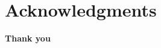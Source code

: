 \section*{Acknowledgments}

\lipsum[22]

\lipsum[54]

\lipsum[76]


\vspace{1.5\baselineskip}
\begin{center}
  \textbf{Thank you}
\end{center}
